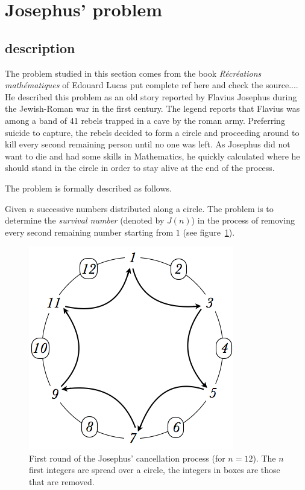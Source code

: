 \section{Josephus' problem}


\subsection{description}

The problem studied in this section comes from the book \textit{R\'ecr\'eations math\'ematiques} of Edouard Lucas {\Denis put complete ref here and check the source...}.
He described this problem as an old story reported by Flavius Josephus during the Jewish-Roman war 
in the first century. 
The legend reports that Flavius was among a band of 41 rebels trapped in a cave by the roman army. Preferring suicide to capture, the
rebels decided to form a circle and proceeding around to kill every second remaining person until no one was left.
As Josephus did not want to die and had some skills in Mathematics, he quickly calculated
where he should stand in the circle in order to stay alive at the end of the process.
\medskip

The problem is formally described as follows.
 
Given $n$ successive numbers distributed along a circle.
The problem is to determine the \textit{survival number} (denoted by $J(n)$)
in the process of removing every second remaining number starting from $1$ (see figure~\ref{fig:josephus12step1}).
\begin{figure}[h]
\begin{center}
        \includegraphics[scale=0.4]{FiguresMaths/josephus12step1}
        \caption{First round of the Josephus' cancellation process (for $n=12$).
        The $n$ first integers are spread over a circle, the integers in boxes are those that are removed.}
        \label{fig:josephus12step1}
\end{center}
\end{figure}


